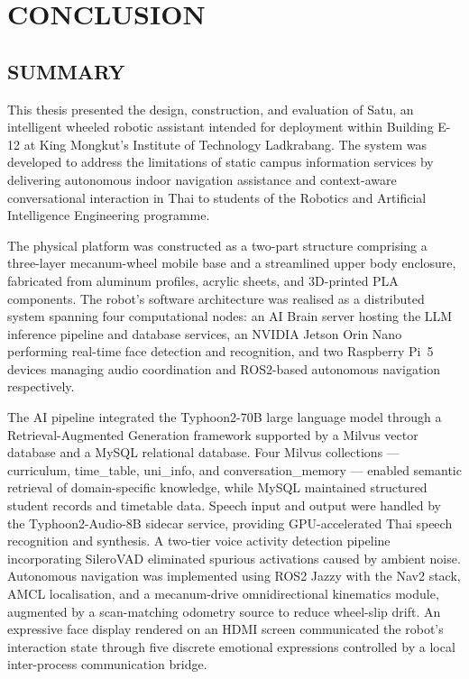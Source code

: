 \chapter{CONCLUSION}

\section{SUMMARY}

This thesis presented the design, construction, and evaluation of Satu, an intelligent wheeled robotic assistant intended for deployment within Building E-12 at King Mongkut's Institute of Technology Ladkrabang. The system was developed to address the limitations of static campus information services by delivering autonomous indoor navigation assistance and context-aware conversational interaction in Thai to students of the Robotics and Artificial Intelligence Engineering programme.

The physical platform was constructed as a two-part structure comprising a three-layer mecanum-wheel mobile base and a streamlined upper body enclosure, fabricated from aluminum profiles, acrylic sheets, and 3D-printed PLA components. The robot's software architecture was realised as a distributed system spanning four computational nodes: an AI Brain server hosting the LLM inference pipeline and database services, an NVIDIA Jetson Orin Nano performing real-time face detection and recognition, and two Raspberry Pi~5 devices managing audio coordination and ROS2-based autonomous navigation respectively.

The AI pipeline integrated the Typhoon2-70B large language model through a Retrieval-Augmented Generation framework supported by a Milvus vector database and a MySQL relational database. Four Milvus collections — curriculum, time\_table, uni\_info, and conversation\_memory — enabled semantic retrieval of domain-specific knowledge, while MySQL maintained structured student records and timetable data. Speech input and output were handled by the Typhoon2-Audio-8B sidecar service, providing GPU-accelerated Thai speech recognition and synthesis. A two-tier voice activity detection pipeline incorporating SileroVAD eliminated spurious activations caused by ambient noise. Autonomous navigation was implemented using ROS2 Jazzy with the Nav2 stack, AMCL localisation, and a mecanum-drive omnidirectional kinematics module, augmented by a scan-matching odometry source to reduce wheel-slip drift. An expressive face display rendered on an HDMI screen communicated the robot's interaction state through five discrete emotional expressions controlled by a local inter-process communication bridge.

